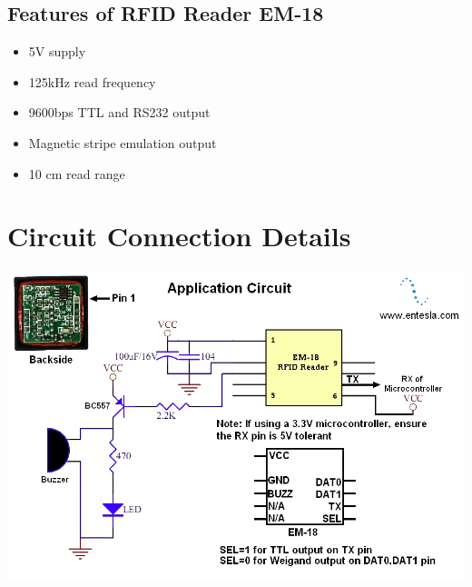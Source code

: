\documentclass[a4paper,29.6pt]{article}
\begin{document}
\subsection{Features of RFID Reader EM-18}
\begin{itemize}
\item	5V supply
\item	125kHz read frequency
\item	9600bps TTL and RS232 output
\item	Magnetic stripe emulation output
\item	10 cm read range
\end{itemize}

\newpage

\section{Circuit Connection Details}
\includegraphics[scale=0.4]{app}
\cite{app}
\end{document}
